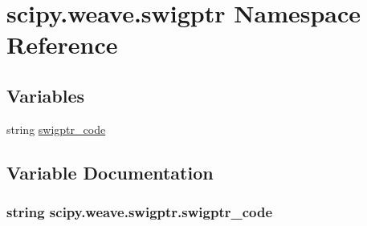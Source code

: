 \hypertarget{namespacescipy_1_1weave_1_1swigptr}{}\section{scipy.\+weave.\+swigptr Namespace Reference}
\label{namespacescipy_1_1weave_1_1swigptr}
\subsection*{Variables}
\begin{DoxyCompactItemize}
\item 
string \hyperlink{namespacescipy_1_1weave_1_1swigptr_a4ea019848c2d352771c20f2ba29aed95}{swigptr\+\_\+code}
\end{DoxyCompactItemize}


\subsection{Variable Documentation}
\hypertarget{namespacescipy_1_1weave_1_1swigptr_a4ea019848c2d352771c20f2ba29aed95}{}
\subsubsection[{swigptr\+\_\+code}]{\setlength{\rightskip}{0pt plus 5cm}string scipy.\+weave.\+swigptr.\+swigptr\+\_\+code}\label{namespacescipy_1_1weave_1_1swigptr_a4ea019848c2d352771c20f2ba29aed95}
